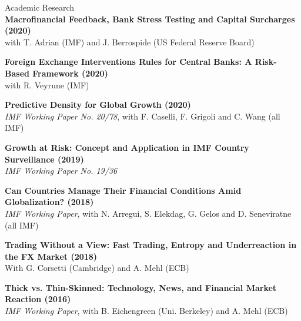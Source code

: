 \documentclass[usegeometry, 10pt, a4paper]{cv} %
\newcommand{\activite}[1]{\textbf{#1}\ }
\begin{document}
\newpage


\begin{rubriquetableau}[0.95\textwidth]{Academic Research}\\


\small
\activite{Macrofinancial Feedback, Bank Stress Testing and Capital Surcharges (2020)} \\
\hspace{0.6cm} \small{with T. Adrian (IMF) and J. Berrospide (US Federal Reserve Board)}
\vspace{0.4cm} 
  
\small
\activite{Foreign Exchange Interventions Rules for Central Banks: A Risk-Based Framework (2020)} \\
\hspace{0.6cm} \small{with R. Veyrune (IMF)}
\vspace{0.4cm} 
  

\small
\activite{Predictive Density for Global Growth (2020)} \\
\hspace{0.6cm} \small{\emph{IMF Working Paper No. 20/78}, with F. Caselli, F. Grigoli and C. Wang (all IMF)}
\vspace{0.4cm} 

  
\small
\activite{Growth at Risk: Concept and Application in IMF Country Surveillance (2019)} \\
\hspace{0.6cm} \small{\emph{IMF Working Paper No. 19/36}}
\vspace{0.4cm} 

\small
\activite{Can Countries Manage Their Financial Conditions Amid Globalization? (2018)} \\
\hspace{0.6cm} \small{\emph{IMF Working Paper}, with N. Arregui, S. Elekdag, G. Gelos and D. Seneviratne (all IMF)}
\vspace{0.4cm} 

\small
\activite{Trading Without a View: Fast Trading, Entropy and Underreaction in the FX  Market (2018)} \\
\hspace{0.6cm} \small{With G. Corsetti (Cambridge) and A. Mehl (ECB)}
\vspace{0.4cm} 

\small
\activite{Thick vs. Thin-Skinned: Technology, News, and Financial Market Reaction (2016)} \\
\hspace{0.6cm} \small{\emph{IMF Working Paper}, with B. Eichengreen (Uni. Berkeley) and A. Mehl (ECB)}
\vspace{0.4cm} 


\end{rubriquetableau}
\end{document}
